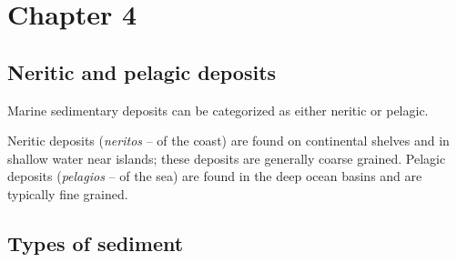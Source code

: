 \section{Chapter 4}

\subsection{Neritic and pelagic deposits}

Marine sedimentary deposits can be categorized as either neritic or pelagic.

Neritic deposits (\textit{neritos} -- of the coast) are found on continental
shelves and in shallow water near islands; these deposits are generally coarse
grained. Pelagic deposits (\textit{pelagios} -- of the sea)  are found in the
deep ocean basins and are typically fine grained. 

\subsection{Types of sediment}

